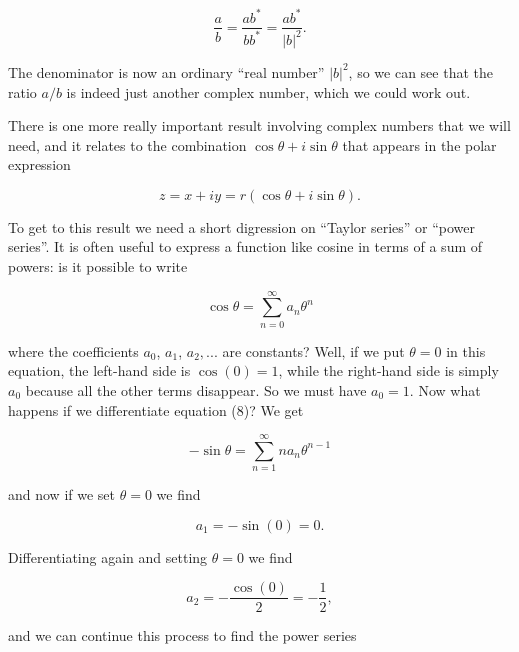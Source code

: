   \begin{equation*}\dfrac{a}{b}=\dfrac{a b^*}{b b^*}=\dfrac{a b^*}{|b|^2}. 
  \tag{6}\end{equation*} 

  The denominator is now an ordinary ``real number'' $|b|^2$, so we can see 
  that the ratio $a/b$ is indeed just another complex number, which we could 
  work out. 

  There is one more really important result involving complex numbers that we 
  will need, and it relates to the combination $\cos \theta + i \sin \theta$ 
  that appears in the polar expression 

  \begin{equation*}z=x+iy=r(\cos \theta +i \sin \theta) . 
  \tag{7}\end{equation*} 

  To get to this result we need a short digression on ``Taylor series'' or 
  ``power series''. It is often useful to express a function like cosine in 
  terms of a sum of powers: is it possible to write 

  \begin{equation*}\cos \theta =\sum_{n=0}^\infty{a_n \theta^n} 
  \tag{8}\end{equation*} 

  \noindent{}where the coefficients $a_0$, $a_1$, $a_2,...$ are constants? 
  Well, if we put $\theta =0$ in this equation, the left-hand side is 
  $\cos(0)=1$, while the right-hand side is simply $a_0$ because all the other 
  terms disappear. So we must have $a_0=1$. Now what happens if we 
  differentiate equation (8)? We get 

  \begin{equation*}-\sin \theta = \sum_{n=1}^\infty{n a_n \theta^{n-1}} 
  \tag{9}\end{equation*} 

  \noindent{}and now if we set $\theta=0$ we find 

  \begin{equation*}a_1 = -\sin(0)=0. \tag{10}\end{equation*} 

  Differentiating again and setting $\theta=0$ we find 

  \begin{equation*}a_2 = -\dfrac{\cos(0)}{2} = -\dfrac{1}{2}, 
  \tag{11}\end{equation*} 

  \noindent{}and we can continue this process to find the power series 

